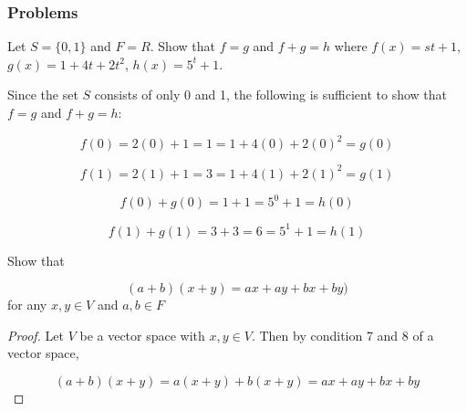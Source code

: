 \subsubsection*{Problems}


\begin{problem}
		Let \(S = \{0,1\}\) and \(F = R\). Show that \(f = g\) and \(f+g = h\) where \(f(x) = st+1\), \(g(x) = 1 + 4t + 2t^{2}\), \(h(x) = 5^{t} + 1\).

\end{problem}


\begin{solution}
		Since the set \(S\) consists of only 0 and 1, the following is sufficient to show that \(f = g\) and \(f+g = h\):

\[
f(0) = 2(0) + 1 = 1 = 1 + 4(0) + 2(0)^{2} = g(0)
\]

\[
f(1) = 2(1) + 1 = 3 = 1 + 4(1) + 2(1)^{2} = g(1)
\]

\[
f(0) + g(0) = 1 + 1 = 5^{0}+1 = h(0)
\]

\[
f(1) + g(1) = 3 + 3 = 6 = 5^{1}+1 = h(1)
\]

\end{solution}


\begin{problem}
		Show that

\[
(a + b)(x + y) = ax + ay + bx + by)
\]
		for any \(x, y \in V\) and \(a, b \in F\)

\end{problem}


\begin{solution}

\begin{proof}
			Let \(V\) be a vector space with \(x, y \in V\). Then by condition 7 and 8 of a vector space,

\[
(a + b)(x + y) = a(x + y) + b(x + y) = ax + ay + bx + by
\]

\end{proof}
\end{solution}
